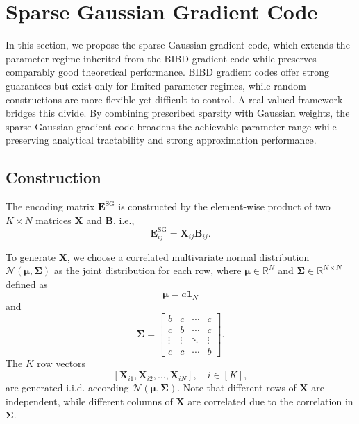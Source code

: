 \documentclass[lettersize,journal]{IEEEtran}
\newcommand{\ones}[1]{\boldsymbol{1}_{#1}}
\newcommand{\GSG}{\boldsymbol{E}^{\mathrm{SG}}}
\newcommand{\gaussian}[2]{\mathcal{N}(#1, #2)}
\newcommand{\muu}{\boldsymbol{\mu}}
\newcommand{\Sigmaa}{\boldsymbol{\Sigma}}
\newcommand{\RR}{\mathbb{R}}
\newcommand{\lele}{\textcolor{cyan}}
\begin{document}
\section{Sparse Gaussian Gradient Code}
\label{sec:SG-GC}
In this section, we propose the sparse Gaussian gradient code, which extends the parameter regime inherited from the BIBD gradient code while preserves comparably good theoretical performance. BIBD gradient codes offer strong guarantees but exist only for limited parameter regimes, while random constructions are more flexible yet difficult to control. A real-valued framework bridges this divide. By combining prescribed sparsity with Gaussian weights, the sparse Gaussian gradient code broadens the achievable parameter range while preserving analytical tractability and strong approximation performance.

\subsection{Construction}

\label{sec:SG-GC-construction}
The encoding matrix $\GSG$ is constructed by the element-wise product of two $K\times N$ matrices $\boldsymbol{X}$ and $\boldsymbol{B}$, i.e., 
\begin{equation}
    \GSG_{ij} = \boldsymbol{X}_{ij} \boldsymbol{B}_{ij}.
\end{equation}

To generate $\boldsymbol{X}$, we choose a correlated multivariate normal distribution $\gaussian{\muu}{\Sigmaa}$ as the joint distribution for each row, where $\muu \in \RR^{N}$ and $\Sigmaa \in \RR^{N\times N}$ defined as 
\begin{equation}
     \muu = a\ones{N}
\end{equation}
and 
\begin{equation}
\label{def:cov-matrix}
    \Sigmaa = \begin{bmatrix}
        b & c & \cdots & c \\
        c & b & \cdots & c \\
        \vdots & \vdots & \ddots & \vdots \\
        c & c & \cdots & b
        \end{bmatrix} .
\end{equation}
The $K$ row vectors
\[
\left[\boldsymbol{X}_{i1}, \boldsymbol{X}_{i2}, \dots, \boldsymbol{X}_{iN}\right], \quad i \in [K],
\]
are generated i.i.d. according  $\gaussian{\muu}{\Sigmaa}$. Note that different rows of $\boldsymbol{X}$ are independent, while different columns of $\boldsymbol{X}$ are correlated due to the correlation in $\Sigmaa$.
\end{document}
